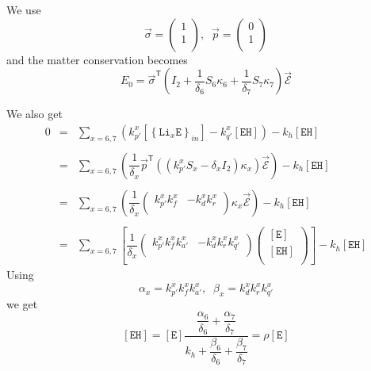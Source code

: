 \documentclass[aps,onecolumn,11pt]{revtex4}
\newcommand{\mychem}[1]{\mathtt{#1}}
\newcommand{\myconc}[1]{\left\lbrack{#1}\right\rbrack}
\newcommand{\LiEin}[1]{\myconc{\left\lbrace\mychem{Li}_{#1}\mychem{E}\right\rbrace_{in}}}
\newcommand{\EHin}{\myconc{\mychem{EH}}}
\newcommand{\Eout}{\myconc{\mychem{E}}}
\newcommand{\mytrn}[1]{{#1}^{\mathsf{T}}}
\begin{document}
We use 
\begin{equation}
	\vec{\sigma} = 
	\begin{pmatrix}
	1\\
	1\\
	\end{pmatrix}, \;\; 
	\vec{p} = 
	\begin{pmatrix}
	0\\
	1\\
	\end{pmatrix}
\end{equation}
and the matter conservation becomes
\begin{equation}
	E_0 = \mytrn{\vec{\sigma}}\left(I_2+\dfrac{1}{\delta_6}S_6\kappa_6+\dfrac{1}{\delta_7}S_7\kappa_7\right) \vec{\mathcal{E}}
\end{equation}

We also get
\begin{equation}
	\begin{array}{rcl}
	0 & = & \displaystyle\sum_{x=6,7}\left( k_{p'}^x \LiEin{x} - k_{q'}^x \EHin \right) - k_h \EHin\\
	\\
	  & = & \displaystyle\sum_{x=6,7}\left(\dfrac{1}{\delta_x} \mytrn{\vec{p}} 
	  \left(
	  	(k_{p'}^xS_x - \delta_x I_2) \kappa_x
	  \right) \vec{\mathcal{E}} \right) - k_h \EHin\\
	  \\
	  & = & \displaystyle\sum_{x=6,7}\left( \dfrac{1}{\delta_x} 
	  \begin{pmatrix}
	  k_{p'}^x k_f^x & -k_d^x k_r^x\\
	  \end{pmatrix}
	  \kappa_x\vec{\mathcal{E}} 
	  \right)- k_h \EHin\\
	  \\
	  & = & \displaystyle\sum_{x=6,7} \left\lbrack \dfrac{1}{\delta_x}
	  \begin{pmatrix}
	  k_{p'}^x k_f^x k_{a'}^x & -k_d^x k_r^x k_{q'}^x\\
	  \end{pmatrix} 
	  \begin{pmatrix}
	  \Eout\\
	  \EHin\\
	  \end{pmatrix}
	  \right\rbrack - k_h \EHin
	\end{array}
\end{equation}
Using
\begin{equation}
	\alpha_x = k_{p'}^x k_f^x k_{a'}^x,\;\;\beta_x=k_d^x k_r^x k_{q'}^x
\end{equation}
we get
\begin{equation}
	\EHin = \Eout
	\dfrac{\dfrac{\alpha_6}{\delta_6}+\dfrac{\alpha_7}{\delta_7}}
	{k_h+\dfrac{\beta_6}{\delta_6}+\dfrac{\beta_7}{\delta_7}}
	= \rho \Eout
\end{equation}
\end{document}
